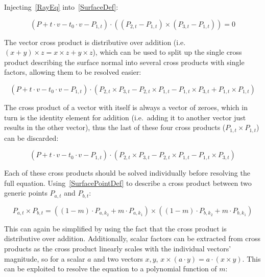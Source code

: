 Injecting~\eqref{RayEq} into~\eqref{SurfaceDef}:

\begin{equation}
    (P + t \cdot v - t_0 \cdot v - P_{1, t}) \cdot ((P_{2, t} - P_{1, t}) \times (P_{3, t} - P_{1, t})) = 0
\end{equation}

The vector cross product is distributive over addition (i.e.\ \( (x + y) \times z = x \times z + y \times z\)),
which can be used to split up the single cross product describing the surface normal into several cross products with single factors,
allowing them to be resolved easier:

\begin{equation*}
    (P + t \cdot v - t_0 \cdot v - P_{1, t}) \cdot
    (P_{2, t} \times P_{3, t} - P_{2, t} \times P_{1, t} - P_{1, t} \times P_{3, t} + P_{1, t} \times P_{1, t})
\end{equation*}

The cross product of a vector with itself is always a vector of zeroes,
which in turn is the identity element for addition (i.e.\ adding it to another vector just results in the other vector),
thus the last of these four cross products (\(P_{1, t} \times P_{1, t}\)) can be discarded:

\begin{equation}\label{SurfaceBeforeCross}
    (P + t \cdot v - t_0 \cdot v - P_{1, t}) \cdot
    (P_{2, t} \times P_{3, t} - P_{2, t} \times P_{1, t} - P_{1, t} \times P_{3, t})
\end{equation}

Each of these cross products should be solved individually before resolving the full equation.
Using~\eqref{SurfacePointDef} to describe a cross product between two generic points \(P_{a, t}\) and \(P_{b, t}\):

\begin{equation}
    P_{a, t} \times P_{b, t}
    = ((1-m) \cdot P_{a, k_2} + m \cdot P_{a, k_1}) \times ((1-m) \cdot P_{b, k_2} + m \cdot P_{b, k_1})
\end{equation}

This can again be simplified by using the fact that the cross product is distributive over addition.
Additionally, scalar factors can be extracted from cross products
as the cross product linearly scales with the individual vectors' magnitude,
so for a scalar \(a\) and two vectors \(x, y\), \(x \times (a \cdot y) = a \cdot (x \times y)\).
This can be exploited to resolve the equation to a polynomial function of \(m\):

